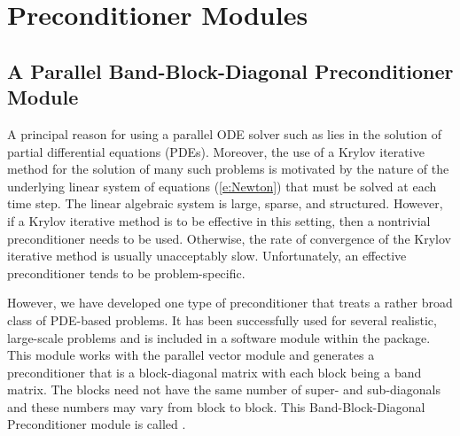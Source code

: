 \section{{\cvodes} Preconditioner Modules}\label{ss:preconds}


\subsection{A Parallel Band-Block-Diagonal Preconditioner Module}\label{sss:cvbbdpre}

A principal reason for using a parallel ODE solver such as {\cvodes} lies
in the solution of partial differential equations (PDEs).  Moreover,
the use of a Krylov iterative method for the solution of many such
problems is motivated by the nature of the underlying linear system of
equations (\ref{e:Newton}) that must be solved at each time step.  The
linear algebraic system is large, sparse, and structured. However, if
a Krylov iterative method is to be effective in this setting, then a
nontrivial preconditioner needs to be used.  Otherwise, the rate of
convergence of the Krylov iterative method is usually unacceptably
slow.  Unfortunately, an effective preconditioner tends to be
problem-specific.

However, we have developed one type of preconditioner that treats a
rather broad class of PDE-based problems.  It has been successfully
used for several realistic, large-scale problems \cite{HiTa:98} and is
included in a software module within the {\cvodes} package. This module
works with the parallel vector module {\nvecp} and 
generates a preconditioner that is a block-diagonal matrix with each
block being a band matrix. The blocks need not have the same number of
super- and sub-diagonals and these numbers may vary from block to
block. This Band-Block-Diagonal Preconditioner module is called
{\cvbbdpre}.

